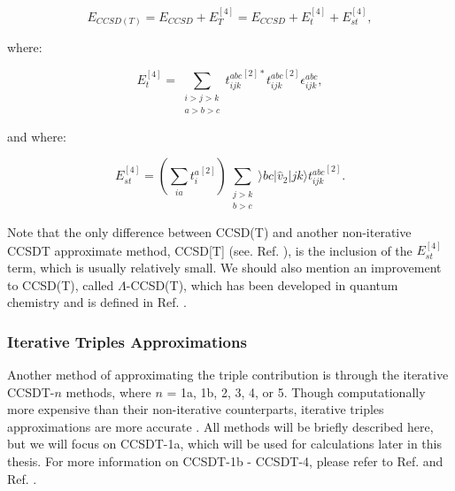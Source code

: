     \begin{equation}
        E_{CCSD(T)} = E_{CCSD} + E_T^{[4]} = E_{CCSD} + E_t^{[4]} + E_{st}^{[4]},
    \end{equation}

    where:
    
    \begin{equation}
        E_t^{[4]} = \sum_{\substack{i > j > k \\ a > b > c}} {t_{ijk}^{abc}}^{[2]*}{t_{ijk}^{abc}}^{[2]}\epsilon^{abc}_{ijk},
    \end{equation}

    and where:
    
    \begin{equation}
        E_{st}^{[4]} = (\sum_{ia}{t_i^a}^{[2]})\sum_{\substack{j>k \\ b>c}} \rangle bc | \hat{v}_2 | jk \rangle {t_{ijk}^{abc}}^{[2]}.
    \end{equation}

    Note that the only difference between CCSD(T) and another non-iterative CCSDT approximate method, CCSD[T] (see. Ref. \cite{Ref157}), is the inclusion of the $E_{st}^{[4]}$ term, which is usually relatively small. We should also mention an improvement to CCSD(T), called $\Lambda$-CCSD(T), which has been developed in quantum chemistry and is defined in Ref. \cite{Ref140}.

    \subsubsection{Iterative Triples Approximations}
    
    Another method of approximating the triple contribution is through the iterative CCSDT-$n$ methods, where $n$ = 1a, 1b, 2, 3, 4, or 5. Though computationally more expensive than their non-iterative counterparts, iterative triples approximations are more accurate \cite{Ref16}. All methods will be briefly described here, but we will focus on CCSDT-1a, which will be used for calculations later in this thesis. For more information on CCSDT-1b - CCSDT-4, please refer to Ref. \cite{Ref155} and Ref. \cite{Ref157}.

